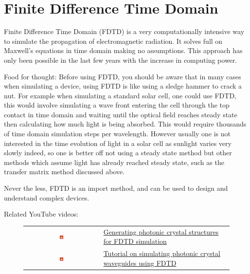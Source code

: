 \section{Finite Difference Time Domain}
Finite Difference Time Domain (FDTD) is a very computationally intensive way to simulate the propagation of electromagnetic radiation.  It solves full on Maxwell's equations in time domain making no assumptions.  This approach has only been possible in the last few years with the increase in computing power.

Food for thought: Before using FDTD, you should be aware that in many cases when simulating a device, using FDTD is like using a sledge hammer to crack a nut.  For example when simulating a standard solar cell, one could use FDTD, this would involve simulating a wave front entering the cell through the top contact in time domain and waiting until the optical field reaches steady state then calculating how much light is being absorbed. This would require thousands of time domain simulation steps per wavelength.  However usually one is not interested in the time evolution of light in a solar cell as sunlight varies very slowly indeed, so one is better off not using a steady state method but other methods which assume light has already reached steady state, such as the transfer matrix method discussed above.

Never the less, FDTD is an import method, and can be used to design and understand complex devices.

Related YouTube videos:
\begin{figure}[H]

\begin{tabular}{ c l }

\includegraphics[width=0.05\textwidth]{./images/youtube.png}

&
\href{https://www.youtube.com/watch?v=il4Asw4-yQQ}{Generating photonic crystal structures for FDTD simulation}\
\\
\includegraphics[width=0.05\textwidth]{./images/youtube.png}

&
\href{https://www.youtube.com/watch?v=cnd5VRK56YM}{Tutorial on simulating photonic crystal waveguides using FDTD}

\end{tabular}
\end{figure}



